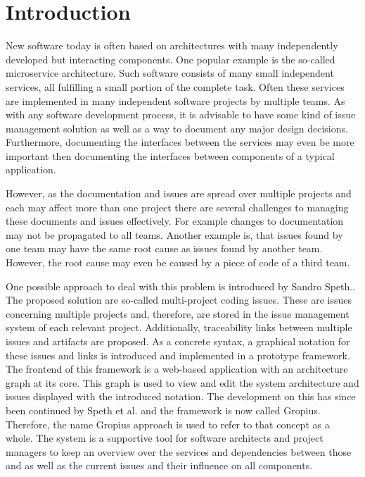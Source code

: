 
\chapter{Introduction}
\label{chap:ch1}
New software today is often based on architectures with many independently developed but interacting components.
One popular example is the so-called microservice architecture.
Such software consists of many small independent services, all fulfilling a small portion of the complete task.
Often these services are implemented in many independent software projects by multiple teams.
As with any software development process, it is advisable to have some kind of issue management solution 
as well as a way to document any major design decisions.
Furthermore, documenting the interfaces between the services may even be more important 
then documenting the interfaces between components of a typical application.

However, as the documentation and issues are spread over multiple projects
and each may affect more than one project there are several challenges to managing these documents and issues effectively.
For example changes to documentation may not be propagated to all teams. 
Another example is, that issues found by one team may have the same root cause as issues found by another team.
However, the root cause may even be caused by a piece of code of a third team.

One possible approach to deal with this problem is introduced by Sandro Speth.\cite{Speth2019}.
The proposed solution are so-called multi-project coding issues. 
These are issues concerning multiple projects and, therefore, are stored in the issue management system of each relevant project. 
Additionally, traceability links between multiple issues and artifacts are proposed.
As a concrete syntax, a graphical notation for these issues and links is introduced and implemented in a prototype framework. 
The frontend of this framework is a web-based application with an architecture graph at its core.
This graph is used to view and edit the system architecture and issues displayed with the introduced notation.
The development on this has since been continued by Speth et al. \cite{speth2020gropius} and the framework is now called \gls{Gropius}.
Therefore, the name \gls{Gropius} approach is used to refer to that concept as a whole.
The system is a supportive tool for software architects and project managers to keep an overview over the services
and dependencies between those and as well as the current issues and their influence on all components.

